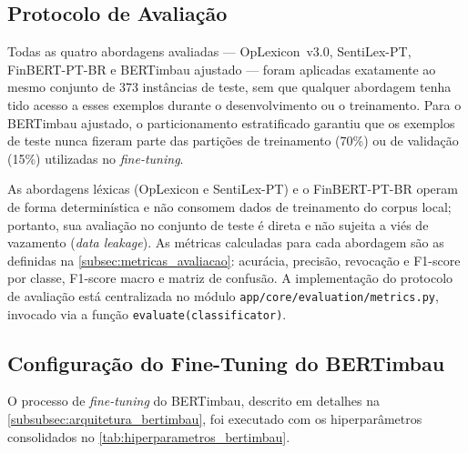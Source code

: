 \subsection{Protocolo de Avaliação}
\label{subsec:protocolo_avaliacao}

Todas as quatro abordagens avaliadas — OpLexicon~v3.0, SentiLex-PT, FinBERT-PT-BR e BERTimbau ajustado --- foram aplicadas exatamente ao mesmo conjunto de 373 instâncias de teste, sem que qualquer abordagem tenha tido acesso a esses exemplos durante o desenvolvimento ou o treinamento. Para o BERTimbau ajustado, o particionamento estratificado garantiu que os exemplos de teste nunca fizeram parte das partições de treinamento (70\%) ou de validação (15\%) utilizadas no \textit{fine-tuning}.

As abordagens léxicas (OpLexicon e SentiLex-PT) e o FinBERT-PT-BR operam de forma determinística e não consomem dados de treinamento do corpus local; portanto, sua avaliação no conjunto de teste é direta e não sujeita a viés de vazamento (\textit{data leakage}). As métricas calculadas para cada abordagem são as definidas na \autoref{subsec:metricas_avaliacao}: acurácia, precisão, revocação e F1-score por classe, F1-score macro e matriz de confusão. A implementação do protocolo de avaliação está centralizada no módulo \texttt{app/core/evaluation/metrics.py}, invocado via a função \texttt{evaluate(classificator)}.

\subsection{Configuração do Fine-Tuning do BERTimbau}
\label{subsec:config_finetuning}

O processo de \textit{fine-tuning} do BERTimbau, descrito em detalhes na \autoref{subsubsec:arquitetura_bertimbau}, foi executado com os hiperparâmetros consolidados no \autoref{tab:hiperparametros_bertimbau}.

